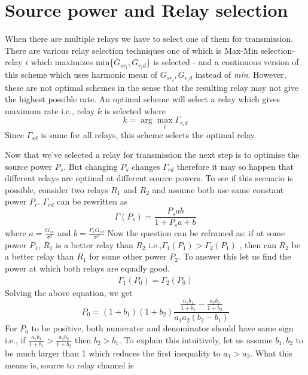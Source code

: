 \documentclass[conference]{IEEEtran}
\begin{document}
\section{Source power and Relay selection}
When there are multiple relays we have to select one of them for transmission. 
There are various relay selection techniques one of which is Max-Min selection-
relay $i$ which maximizes min\{$G_{sr_i},G_{r_id}$\} is selected -  and a 
continuous version of this scheme which uses harmonic mean of $G_{sr_i},G_{r_id}$
instead of \textit{min}. However, these are not optimal schemes in the sense that
the resulting relay may not give the highest possible rate. An optimal scheme
will select a relay which gives maximum rate i.e., relay $k$ is selected
where 
\begin{equation}
	k = \arg \max\limits_{i} \Gamma_{r_id}
\end{equation}
Since $\Gamma_{sd}$ is same for all relays, this scheme selects the optimal
relay. 
\par
Now that we've selected a relay for transmission the next step is 
to optimise the source power $P_s$. But changing $P_s$ changes $\Gamma_{rd}$ therefore it may so happen that different relays are optimal at different
source powers. To see if this scenario is possible, consider two
relays $R_1$ and $R_2$ and assume both use same constant power $P_r$.
$\Gamma_{rd}$ can be rewritten as
\begin{equation}
	\Gamma(P_s) = \frac{P_s ab}{1+P_s a + b} 
\end{equation}
where $a = \frac{G_{sr}}{\sigma^2}$ and $b = \frac{P_{r} G_{r d}}{\sigma^2}$
Now the question can be reframed as: if at some power $P_1$, $R_1$ is a better
relay than $R_2$ i.e.,$\Gamma_1(P_1) > \Gamma_2(P_1)$ , then can $R_2$ be 
a better relay than $R_1$ for some other power $P_2$. To answer this 
let us find the power at which both relays are equally good.
\begin{align*}
	\Gamma_1(P_0) = \Gamma_2(P_0)
\end{align*}
Solving the above equation, we get
\begin{equation}
	P_0 = (1+b_1)(1+b_2) \frac{\frac{a_1b_1}{1+b_1} - 
	\frac{a_2b_2}{1+b_2}}{a_1a_2(b_2-b_1)}
\end{equation}
For $P_0$ to be positive, both numerator and denominator should 
have same sign i.e., if 
$\frac{a_1b_1}{1+b_1} >	\frac{a_2b_2}{1+b_2}$ then $b_2 > b_1$.
To explain this intuitively, let us assume $b_1,b_2$ to be 
much larger than 1 which reduces the first inequality to
$a_1 > a_2$. What this means is, source to relay channel is 
\end{document}
